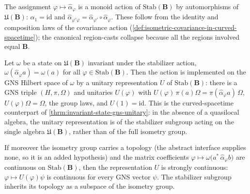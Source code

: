 \begin{lemma}
    \label{lmm:stabilizer-action-laws-in-curved-spacetime}
    \leanok
    The assignment $\varphi \mapsto \hat\alpha_\varphi$ is a monoid action of $\mathrm{Stab}(\mathbf{B})$ by automorphisms of $\mathfrak{U}(\mathbf{B})$: $\hat\alpha_1 = \mathrm{id}$ and $\hat\alpha_{\varphi'\varphi} = \hat\alpha_{\varphi'}\circ\hat\alpha_\varphi$. These follow from the identity and composition laws of the covariance action (\ref{def:isometric-covariance-in-curved-spacetime}); the canonical region-casts collapse because all the regions involved equal $\mathbf{B}$.
\end{lemma}

\begin{theorem}
    \label{thrm:gns-unitary-stabilizer-in-curved-spacetime}
    \leanok
    Let $\omega$ be a state on $\mathfrak{U}(\mathbf{B})$ invariant under the stabilizer action, $\omega(\hat\alpha_\varphi a) = \omega(a)$ for all $\varphi \in \mathrm{Stab}(\mathbf{B})$. Then the action is implemented on the GNS Hilbert space of $\omega$ by a unitary representation $U$ of $\mathrm{Stab}(\mathbf{B})$: there is a GNS triple $(H, \pi, \Omega)$ and unitaries $U(\varphi)$ with $U(\varphi)\,\pi(a)\Omega = \pi(\hat\alpha_\varphi a)\,\Omega$, $U(\varphi)\Omega = \Omega$, the group laws, and $U(1) = \mathrm{id}$. This is the curved-spacetime counterpart of \ref{thrm:invariant-state-gns-unitary}: in the absence of a quasilocal algebra, the unitary representation is of the stabilizer subgroup acting on the single algebra $\mathfrak{U}(\mathbf{B})$, rather than of the full isometry group.
\end{theorem}

\begin{theorem}
    \label{thrm:gns-unitary-stabilizer-strongly-continuous-in-curved-spacetime}
    \leanok
    If moreover the isometry group carries a topology (the abstract interface supplies none, so it is an added hypothesis) and the matrix coefficients $\varphi \mapsto \omega\big(a^*\,\hat\alpha_\varphi b\big)$ are continuous on $\mathrm{Stab}(\mathbf{B})$, then the representation $U$ is strongly continuous: $\varphi \mapsto U(\varphi)\psi$ is continuous for every GNS vector $\psi$. The stabilizer subgroup inherits its topology as a subspace of the isometry group.
\end{theorem}

